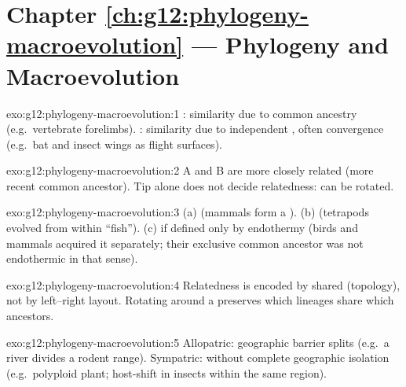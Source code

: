 \section*{Chapter \ref{ch:g12:phylogeny-macroevolution} --- Phylogeny and Macroevolution}

\begin{solution}{exo:g12:phylogeny-macroevolution:1}
: similarity due to common ancestry (e.g.\ vertebrate
forelimbs). : similarity due to independent , often
convergence (e.g.\ bat and insect wings as flight surfaces).
\end{solution}

\begin{solution}{exo:g12:phylogeny-macroevolution:2}
A and B are more closely related (more recent common ancestor). Tip
 alone does not decide relatedness:  can be rotated.
\end{solution}

\begin{solution}{exo:g12:phylogeny-macroevolution:3}
(a)  (mammals form a ). (b)  (tetrapods
evolved from within ``fish''). (c)  if defined only by
endothermy (birds and mammals acquired it separately; their exclusive
common ancestor was not endothermic in that sense).
\end{solution}

\begin{solution}{exo:g12:phylogeny-macroevolution:4}
Relatedness is encoded by shared  (topology), not by left--right
layout. Rotating around a  preserves which lineages share which
ancestors.
\end{solution}

\begin{solution}{exo:g12:phylogeny-macroevolution:5}
Allopatric: geographic barrier splits  (e.g.\ a river divides
a rodent range). Sympatric:  without complete geographic
isolation (e.g.\ polyploid plant; host-shift in insects within the same
region).
\end{solution}

